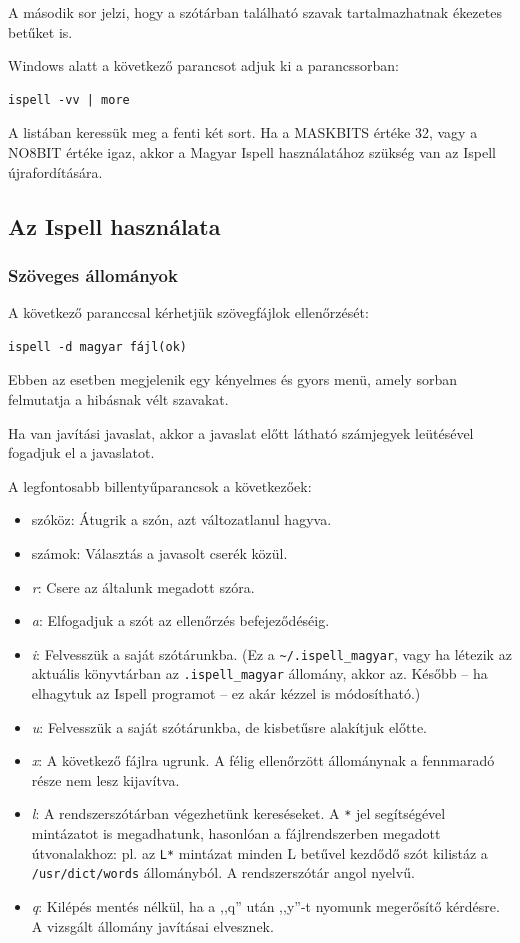 A második sor jelzi, hogy a szótárban található szavak
tartalmazhatnak ékezetes betűket is.

Windows alatt a következő parancsot adjuk ki a
parancssorban:

\begin{verbatim}
ispell -vv | more
\end{verbatim}

A listában keressük meg a fenti két sort.
Ha a MASKBITS értéke 32, vagy a NO8BIT értéke igaz,
akkor a Magyar Ispell használatához szükség van
az Ispell újrafordítására.

\subsection{Az Ispell használata}

\subsubsection{Szöveges állományok}

A következő paranccsal kérhetjük szövegfájlok ellenőrzését:

\begin{verbatim}
ispell -d magyar fájl(ok)
\end{verbatim}

Ebben az esetben megjelenik egy kényelmes és gyors menü,
amely sorban felmutatja a hibásnak vélt szavakat.

Ha van javítási javaslat, akkor a javaslat előtt látható
számjegyek leütésével fogadjuk el a javaslatot.

A legfontosabb billentyűparancsok a következőek:

\begin{itemize}
\item szóköz: Átugrik a szón, azt változatlanul hagyva.
\item számok: Választás a javasolt cserék közül.
\item \emph{r}: Csere az általunk megadott szóra.
\item \emph{a}: Elfogadjuk a szót az ellenőrzés befejeződéséig.
\item \emph{i}: Felvesszük a saját szótárunkba. (Ez a \verb+~/.ispell_magyar+, 
vagy ha létezik az aktuális könyvtárban az \texttt{.ispell\_magyar}
állomány, akkor az.  Később -- ha elhagytuk az Ispell programot -- ez
akár kézzel is módosítható.)
\item \emph{u}: Felvesszük a saját szótárunkba, de kisbetűsre
alakítjuk előtte.
\item \emph{x}: A következő fájlra ugrunk. A félig ellenőrzött 
állománynak a fennmaradó része nem lesz kijavítva.
\item \emph{l}: A rendszerszótárban végezhetünk kereséseket.
A \texttt{*} jel segítségével mintázatot is megadhatunk, hasonlóan
a fájlrendszerben megadott útvonalakhoz: pl. az \texttt{L*}
mintázat minden L betűvel kezdődő szót kilistáz a
\texttt{/usr/dict/words} állományból. A rendszerszótár angol nyelvű.
\item \emph{q}: Kilépés mentés nélkül, ha a ,,q'' után ,,y''-t
nyomunk megerősítő kérdésre. A vizsgált állomány javításai elvesznek.
\end{itemize}

